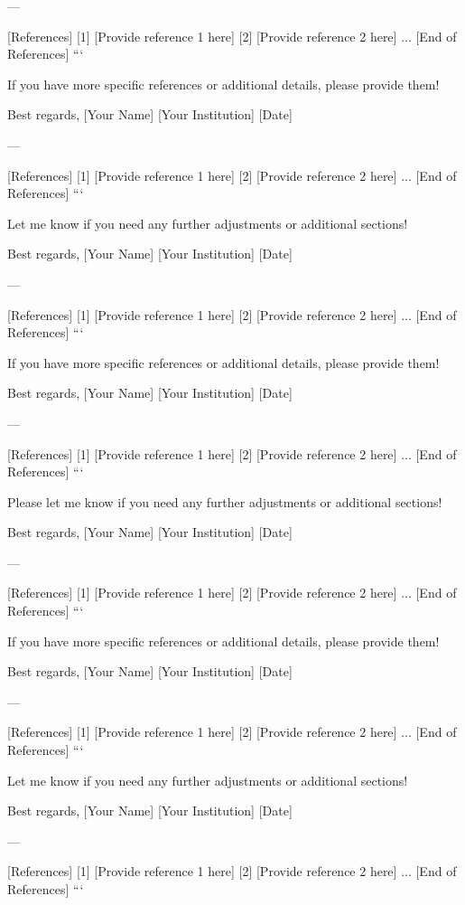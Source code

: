 --- 

[References]  
[1] [Provide reference 1 here]  
[2] [Provide reference 2 here]  
...  
[End of References]  
``` 

If you have more specific references or additional details, please provide them! 

Best regards,  
[Your Name]  
[Your Institution]  
[Date]  

--- 

[References]  
[1] [Provide reference 1 here]  
[2] [Provide reference 2 here]  
...  
[End of References]  
``` 

Let me know if you need any further adjustments or additional sections! 

Best regards,  
[Your Name]  
[Your Institution]  
[Date]  

--- 

[References]  
[1] [Provide reference 1 here]  
[2] [Provide reference 2 here]  
...  
[End of References]  
``` 

If you have more specific references or additional details, please provide them! 

Best regards,  
[Your Name]  
[Your Institution]  
[Date]  

--- 

[References]  
[1] [Provide reference 1 here]  
[2] [Provide reference 2 here]  
...  
[End of References]  
``` 

Please let me know if you need any further adjustments or additional sections! 

Best regards,  
[Your Name]  
[Your Institution]  
[Date]  

--- 

[References]  
[1] [Provide reference 1 here]  
[2] [Provide reference 2 here]  
...  
[End of References]  
``` 

If you have more specific references or additional details, please provide them! 

Best regards,  
[Your Name]  
[Your Institution]  
[Date]  

--- 

[References]  
[1] [Provide reference 1 here]  
[2] [Provide reference 2 here]  
...  
[End of References]  
``` 

Let me know if you need any further adjustments or additional sections! 

Best regards,  
[Your Name]  
[Your Institution]  
[Date]  

--- 

[References]  
[1] [Provide reference 1 here]  
[2] [Provide reference 2 here]  
...  
[End of References]  
``` 

